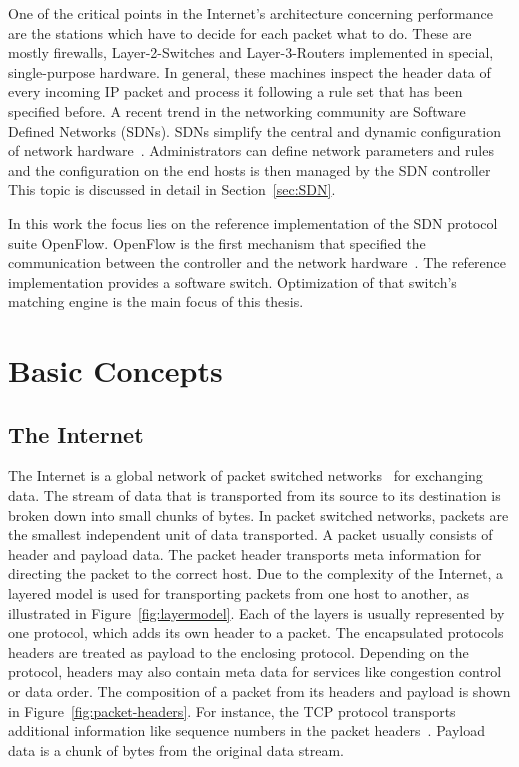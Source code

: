 \documentclass[a4paper,
		12pt,
		parskip=full,
		titlepage
		]{scrartcl}
\begin{document}
One of the critical points in the Internet's architecture concerning performance 
are the stations which have to decide for each packet what to do.
These are mostly firewalls, Layer-2-Switches and Layer-3-Routers implemented in special, single-purpose hardware.
In general, these machines inspect the header data of every incoming IP packet and process it 
following a rule set that has been specified before.
A recent trend in the networking community are Software Defined Networks (SDNs).
SDNs simplify the central and dynamic configuration of network hardware~\cite{onf_whitepaper}.
Administrators can define network parameters and rules and the configuration on the end hosts is then managed by the SDN controller
This topic is discussed in detail in Section~\ref{sec:SDN}.

In this work the focus lies on the reference implementation of the SDN protocol suite OpenFlow.
OpenFlow is the first mechanism that specified the communication between the controller and the network hardware~\cite{onf_whitepaper}.
The reference implementation provides a software switch.
Optimization of that switch's matching engine is the main focus of this thesis.

\section{Basic Concepts}
\subsection{The Internet}
The Internet is a global network of packet switched networks~\cite[Chapter 1.1]{kurose_ross} for exchanging data. 
The stream of data that is transported from its source to its destination is broken down into small chunks of bytes.
In packet switched networks, packets are the smallest independent unit of data transported.
A packet usually consists of header and payload data.
The packet header transports meta information for directing the packet to the correct host.
Due to the complexity of the Internet, a layered model is used for transporting 
packets from one host to another, as illustrated in Figure~\ref{fig:layermodel}.
Each of the layers is usually represented by one protocol, which adds its own header to a packet.
The encapsulated protocols headers are treated as payload to the enclosing protocol.
Depending on the protocol, headers may also contain meta data for services like congestion control or data order.
The composition of a packet from its headers and payload is shown in Figure~\ref{fig:packet-headers}.
For instance, the TCP protocol transports additional information like sequence numbers in the packet headers~\cite[Chapter 3.5]{kurose_ross}.
Payload data is a chunk of bytes from the original data stream.
\end{document}
